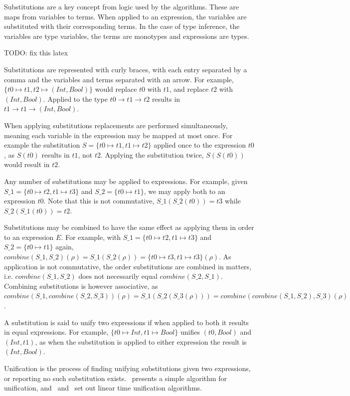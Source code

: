 \documentclass[a4paper,fleqn,12pt]{article}
\begin{document}
Substitutions are a key concept from logic used by the algorithms. These are maps from variables to terms. When applied to an expression, the variables are substituted with their corresponding terms. In the case of type inference, the variables are type variables, the terms are monotypes and expressions are types.

TODO: fix this latex

Substitutions are represented with curly braces, with each entry separated by a comma and the variables and terms separated with an arrow. For example, $\{ t0 \mapsto t1, t2 \mapsto (Int, Bool) \}$ would replace $t0$ with $t1$, and replace $t2$ with $(Int, Bool)$. Applied to the type $t0 \rightarrow t1 \rightarrow t2$ results in $t1 \rightarrow t1 \rightarrow (Int, Bool)$.

When applying substitutions replacements are performed simultaneously, meaning each variable in the expression may be mapped at most once. For example the substitution $S = \{ t0 \mapsto t1, t1 \mapsto t2 \}$ applied once to the expression $t0$, as $S(t0)$ results in $t1$, not $t2$. Applying the substitution twice, $S(S(t0))$ would result in $t2$.

Any number of substitutions may be applied to expressions. For example, given $S\_1 = \{ t0 \mapsto t2, t1 \mapsto t3 \}$ and $S\_2 = \{ t0 \mapsto t1 \}$, we may apply both to an expression $t0$. Note that this is not commutative, $S\_1(S\_2(t0)) = t3$ while $S\_2(S\_1(t0)) = t2$.

Substitutions may be combined to have the same effect as applying them in order to an expression $E$. For example, with $S\_1 = \{ t0 \mapsto t2, t1 \mapsto t3 \}$ and $S\_2 = \{ t0 \mapsto t1 \}$ again, $combine(S\_1, S\_2)(\rho) = S\_1(S\_2(\rho)) = \{ t0 \mapsto t3, t1 \mapsto t3 \}(\rho)$. As application is not commutative, the order substitutions are combined in matters, i.e. $combine(S\_1, S\_2)$ does not necessarily equal $combine(S\_2, S\_1)$. Combining substitutions is however associative, as $combine(S\_1, combine(S\_2, S\_3))(\rho) = S\_1(S\_2(S\_3(\rho))) = combine(combine(S\_1, S\_2), S\_3)(\rho)$.

A substitution is said to unify two expressions if when applied to both it results in equal expressions. For example, $\{ t0 \mapsto Int, t1 \mapsto Bool \}$ unifies $(t0, Bool)$ and $(Int, t1)$, as when the substitution is applied to either expression the result is $(Int, Bool)$.

Unification is the process of finding unifying substitutions given two expressions, or reporting no such substitution exists.~\cite{ref29} presents a simple algorithm for unification, and~\cite{ref30} and~\cite{ref31} set out linear time unification algorithms.
\end{document}
